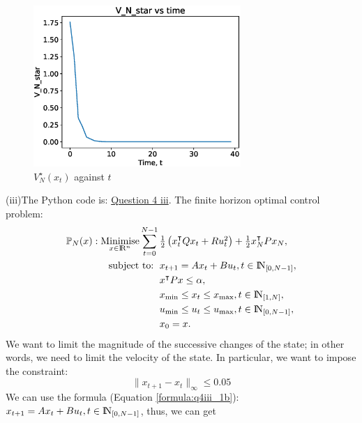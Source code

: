 \documentclass[a4paper,11pt,reqno]{amsart}
\newcommand{\R}{{\rm I\!R}}
\newcommand{\N}{{\rm I\!N}}
\newcommand{\tran}{\intercal}
\DeclareMathOperator*{\minimise}{Minimise}
\begin{document}
\begin{figure}[H]
    \centering
    \includegraphics[width=0.7\textwidth]{figures/q4_ii.eps}
    \caption{$V^{\star}_{N}(x_t)$ against $t$}
    \label{fig:q4_ii}
\end{figure}
(iii)The Python code is: \href{https://github.com/Gczmy/ELE8088/blob/main/Lab1/Python_code/Question4/Question4_iii.py}{Question 4 iii}. 
The finite horizon optimal control problem:
\begin{subequations}
    \begin{align}
        \mathbb{P}_N(x): \minimise_{x\in \R^n}\sum_{t=0}^{N-1}\, 
        & \textstyle\frac{1}{2}\left(x_t^{\tran}Qx_t+Ru^2_t\right)+\frac{1}{2}x_N^{\tran}Px_N,
        \\
        \text{subject to: }\,
        & x_{t+1} = A x_t + B u_t, t\in\N_{[0, N-1]}, \label{formula:q4iii_1b}
        \\
        & x^{\tran}Px\leq \alpha,
        \\
        & x_{\mathrm{min}}\leq x_t\leq x_{\mathrm{max}}, t \in \N_{[1, N]},
        \\
        & u_{\mathrm{min}}\leq u_t\leq u_{\mathrm{max}}, t \in \N_{[0, N-1]},
        \\
        & x_{0} = x.
    \end{align}
\end{subequations}
We want to limit the magnitude of the successive changes of the state; in other
words, we need to limit the velocity of the state. In particular, we want to impose the constraint:
$$\|x_{t+1}-x_t\|_{\infty}\leq 0.05$$
We can use the formula (Equation \ref{formula:q4iii_1b}): $x_{t+1} = A x_t + B u_t, t\in\N_{[0, N-1]}$, thus, we can get
\end{document}
